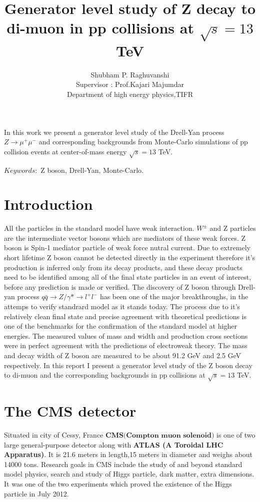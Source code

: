 \documentclass{article}		%
\title{\textbf { Generator level study of Z decay to di-muon in pp collisions at $\sqrt{s}=13$ TeV}}
\author{Shubham P. Raghuvanshi\\Supervisor : Prof.Kajari Majumdar\\Department of high energy physics,TIFR}
\begin{document}
\maketitle


In this work we present a generator level study of the Drell-Yan process $Z \to \mu^+\mu^-$ and corresponding backgrounds from Monte-Carlo simulations of pp collision events at center-of-mass energy $\sqrt{s}=13$ TeV.


$Keywords :$ Z boson, Drell-Yan, Monte-Carlo.  

\newpage

\tableofcontents
\newpage
\section{Introduction}

All the particles in the standard model have weak interaction. $W^\pm $ and Z particles are the intermediate vector bosons which are mediators of these weak forces. Z boson is Spin-1 mediator particle of weak force nutral current. Due to extremely short lifetime Z boson cannot be detected directly in the experiment therefore it's production is inferred only from its decay products, and these decay products need to be identified among all of the final state particles in an event of interest, before any prediction is made or verified. The discovery of Z boson through Drell-yan process $q\bar{q} \to Z/\gamma* \to l^+l^-$ has been one of the major breakthroughs, in the attemps to verify standrard model as it stands today. The process due to it's relatively clean final state and precise agreement with theoretical predictions is one of the benchmarks for the confirmation of the standard model at higher energies. The measured values of mass and width and production cross sections were in perfect agreement with the predictions of electroweak theory. The mass and decay width of Z boson are measured to be about 91.2 GeV and 2.5 GeV respectively. In this report I present a generator level study of the Z boson decay to di-muon and the corresponding backgrounds in pp collisions at $\sqrt{s}=13$ TeV.


\section{The CMS detector}


Situated in city of Cessy, France $\textbf{CMS(Compton muon solenoid)}$ is one  of two large general-purpose detector along with \textbf{ATLAS (A Toroidal
LHC Apparatus)}. It is 21.6 meters in length,15 meters in diameter and weighs about 14000 tons. Research goals in CMS include the study of and beyond standard model physics, search and study of Higgs particle, dark matter, extra dimensions. It was one of the two experiments which proved the existence of the Higgs particle in July 2012.
\end{document}

